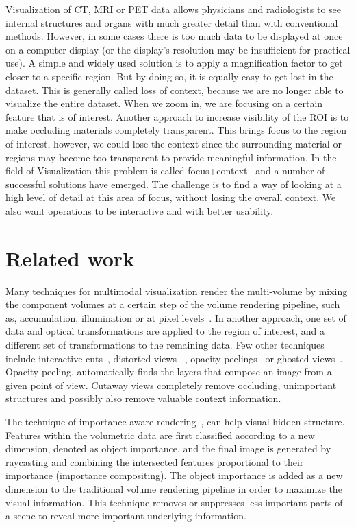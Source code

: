 Visualization of CT, MRI or PET data allows physicians and radiologists to see internal structures and organs with much greater detail than with conventional methods. However, in some cases there is too much data to be displayed at once on a computer display (or the display’s resolution may be insufficient for practical use). A simple and widely used solution is to apply a magnification factor to get closer to a specific region. But by doing so, it is equally easy to get lost in the dataset. This is generally called loss of context, because we are no longer able to visualize the entire dataset. When we zoom in, we are focusing on a certain feature that is of interest. Another approach to increase visibility of the ROI is to make occluding materials completely transparent. This brings focus to the region of interest, however, we could lose the context since the surrounding material or regions may become too transparent to provide meaningful information. In the field of Visualization this problem is called focus+context~\cite{robert2001} and a number of successful solutions have emerged. The challenge is to find a way of looking at a high level of detail at this area of focus, without losing the overall context. We also want operations to be interactive and with better usability.


\section{Related work}

Many techniques for multimodal visualization render the multi-volume by mixing the component volumes at a certain step of the volume rendering pipeline, such as, accumulation, illumination or at pixel levels~\cite{pixel}. In another approach, one set of data and optical transformations are applied to the region of interest, and a different set of transformations to the remaining data. Few other techniques include interactive cuts~\cite{cut}, distorted views ~\cite{lens}, opacity peelings~\cite{n} or ghosted views~\cite{h}. Opacity peeling, automatically finds the layers that compose an image from a given point of view. Cutaway views completely remove occluding, unimportant structures and possibly also remove valuable context information.  

The technique of importance-aware rendering~\cite{m}, can help visual hidden structure. Features within the volumetric data are first classified according to a new dimension, denoted as object importance, and the final image is generated by raycasting and combining the intersected features proportional to their importance (importance compositing). The object importance is added as a new dimension to the traditional volume rendering pipeline in order to maximize the visual information. This technique removes or suppresses less important parts of a scene to reveal more important underlying information.  

